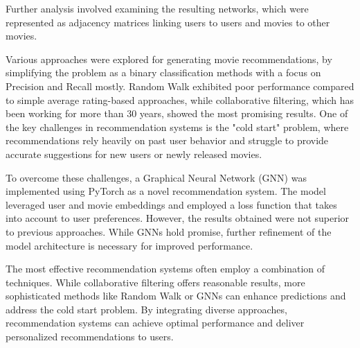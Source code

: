 \documentclass[12pt]{article}
\numberwithin{equation}{section}
\begin{document}
Further analysis involved examining the resulting networks, which were represented as adjacency matrices linking users to users and movies to other movies. 

Various approaches were explored for generating movie recommendations, by simplifying the problem as a binary classification methods with a focus on Precision and Recall mostly. Random Walk exhibited poor performance compared to simple average rating-based approaches, while collaborative filtering, which has been working for more than 30 years, showed the most promising results. One of the key challenges in recommendation systems is the "cold start" problem, where recommendations rely heavily on past user behavior and struggle to provide accurate suggestions for new users or newly released movies.

To overcome these challenges, a Graphical Neural Network (GNN) was implemented using PyTorch as a novel recommendation system. The model leveraged user and movie embeddings and employed a loss function that takes into account to user preferences. However, the results obtained were not superior to previous approaches. While GNNs hold promise, further refinement of the model architecture is necessary for improved performance.

The most effective recommendation systems often employ a combination of techniques. While collaborative filtering offers reasonable results, more sophisticated methods like Random Walk or GNNs can enhance predictions and address the cold start problem. By integrating diverse approaches, recommendation systems can achieve optimal performance and deliver personalized recommendations to users.


\vspace{1em} 




\newpage



\printbibliography
\end{document}

